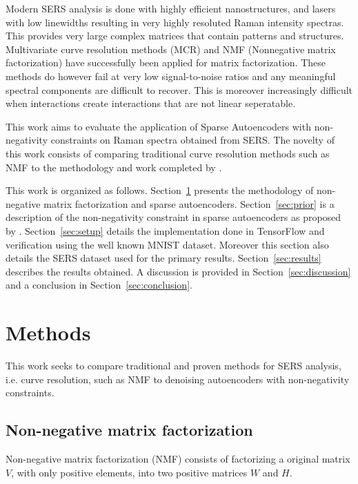 \documentclass{article}
\begin{document}
Modern SERS analysis is done with highly efficient nanostructures, and lasers with low linewidths resulting in very highly resoluted Raman intensity spectras. This provides very large complex matrices that contain patterns and structures. Multivariate curve resolution methods (MCR) and NMF (Nonnegative matrix factorization) have successfully been applied for matrix factorization.\cite{Sajda} These methods do however fail at very low signal-to-noise ratios and any meaningful spectral components are difficult to recover. This is moreover increasingly difficult when interactions create interactions that are not linear seperatable. \cite{Alstrom2017}

This work aims to evaluate the application of Sparse Autoencoders with non-negativity constraints on Raman spectra obtained from SERS. The novelty of this work consists of comparing traditional curve resolution methods such as NMF to the methodology and work completed by \cite{Hosseini-Asl2016}.

This work is organized as follows. Section~\ref{sec:methods} presents the methodology of non-negative matrix factorization and sparse autoencoders. Section~\ref{sec:prior} is a description of the non-negativity constraint in sparse autoencoders as proposed by \cite{Hosseini-Asl2016}. Section~\ref{sec:setup} details the implementation done in TensorFlow and verification using the well known MNIST dataset. Moreover this section also details the SERS dataset used for the primary results. Section~\ref{sec:results} describes the results obtained. A discussion is provided in Section~\ref{sec:discussion} and a conclusion in Section~\ref{sec:conclusion}.


\section{Methods}
\label{sec:methods}

This work seeks to compare traditional and proven methods for SERS analysis, i.e. curve resolution, such as NMF to denoising autoencoders with non-negativity constraints. 

\subsection{Non-negative matrix factorization}

Non-negative matrix factorization (NMF) consists of factorizing a original matrix $V$, with only positive elements, into two positive matrices $W$ and $H$. \cite{Seung1999}
\end{document}
